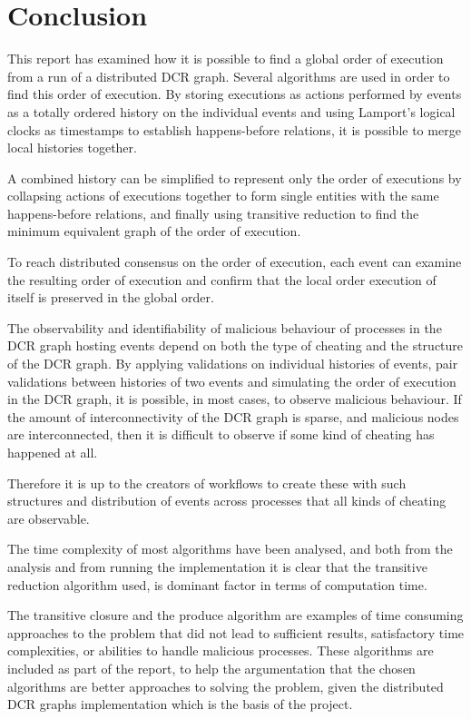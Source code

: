 \chapter*{Conclusion}
This report has examined how it is possible to find a global order of execution from a run of a distributed DCR graph. Several algorithms are used in order to find this order of execution. By storing executions as actions performed by events as a totally ordered history on the individual events and using Lamport's logical clocks as timestamps to establish happens-before relations, it is possible to merge local histories together.

A combined history can be simplified to represent only the order of executions by collapsing actions of executions together to form single entities with the same happens-before relations, and finally using transitive reduction to find the minimum equivalent graph of the order of execution.

To reach distributed consensus on the order of execution, each event can examine the resulting order of execution and confirm that the local order execution of itself is preserved in the global order.

The observability and identifiability of malicious behaviour of processes in the DCR graph hosting events depend on both the type of cheating and the structure of the DCR graph. By applying validations on individual histories of events, pair validations between histories of two events and simulating the order of execution in the DCR graph, it is possible, in most cases, to observe malicious behaviour. If the amount of interconnectivity of the DCR graph is sparse, and malicious nodes are interconnected, then it is difficult to observe if some kind of cheating has happened at all.

Therefore it is up to the creators of workflows to create these with such structures and distribution of events across processes that all kinds of cheating are observable.

The time complexity of most algorithms have been analysed, and both from the analysis and from running the implementation it is clear that the transitive reduction algorithm used, is dominant factor in terms of computation time.

\newpar The transitive closure and the produce algorithm are examples of time consuming approaches to the problem that did not lead to sufficient results, satisfactory time complexities, or abilities to handle malicious processes. These algorithms are included as part of the report, to help the argumentation that the chosen algorithms are better approaches to solving the problem, given the distributed DCR graphs implementation which is the basis of the project.

